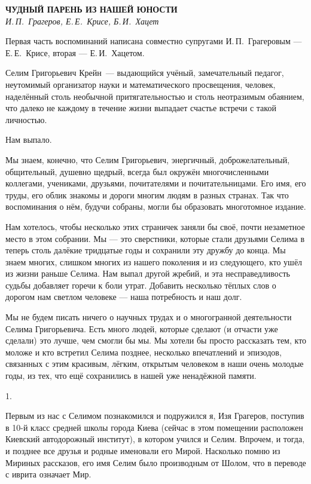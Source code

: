 \begin{center}{ \bf  ЧУДНЫЙ ПАРЕНЬ ИЗ НАШЕЙ ЮНОСТИ}\\
{\it И.\,П.~Грагеров, Е.\,Е.~Крисе, Б.\,И.~Хацет } \\
\end{center}
Первая часть воспоминаний написана совместно супругами И.\,П.~Грагеровым --- Е.\,Е.~Крисе,  вторая --- Е.\,И.~Хацетом.

Селим Григорьевич Крейн~--- выдающийся учёный, замечательный педагог,
неутомимый организатор науки и математического просвещения, человек,
наделённый столь не\-о\-бы\-ч\-ной притягательностью и столь неотразимым обаянием,
что далеко не каждому в течение жизни выпадает счастье встречи с такой личностью.

Нам выпало.

Мы знаем, конечно, что Селим Григорьевич, энергичный, доброжелательный, общительный, душевно щедрый, всегда был окружён многочисленными коллегами, учениками, друзьями, почитателями и почитательницами. Его имя, его труды, его облик знакомы и дороги многим людям в разных странах. Так что воспоминания о нём, будучи собраны, могли бы образовать многотомное издание.

Нам хотелось, чтобы несколько этих страничек заняли бы своё, почти незаметное место в этом собрании. Мы --- это сверстники, которые стали друзьями Селима в теперь столь далёкие тридцатые годы и сохранили эту дружбу до конца. Мы знаем многих, слишком многих из нашего поколения и из следующего, кто ушёл из жизни раньше Селима. Нам выпал другой жребий, и эта несправедливость судьбы добавляет горечи к боли утрат. Добавить несколько тёплых слов о дорогом нам светлом человеке --- наша потребность и наш долг.

Мы не будем писать ничего о научных трудах и о многогранной деятельности Селима Григорьевича. Есть много людей, которые сделают (и отчасти уже сделали) это лучше, чем смогли бы мы. Мы хотели бы просто рассказать тем, кто моложе и кто встретил Селима позднее, несколько впечатлений и эпизодов, связанных с этим красивым, лёгким, открытым человеком в наши очень молодые годы, из тех, что ещё сохранились в нашей уже ненадёжной памяти.

1.

Первым из нас с Селимом познакомился и подружился я, Изя Грагеров,
поступив в 10-й класс средней школы города Киева (сейчас в этом помещении расположен Киевский автодорожный институт),
в котором учился и Селим.
Впрочем, и тогда, и позднее все друзья и родные именовали его Мирой.
Насколько помню из Мириных рассказов, его имя Селим было производным от Шолом, что в переводе с иврита означает Мир.

